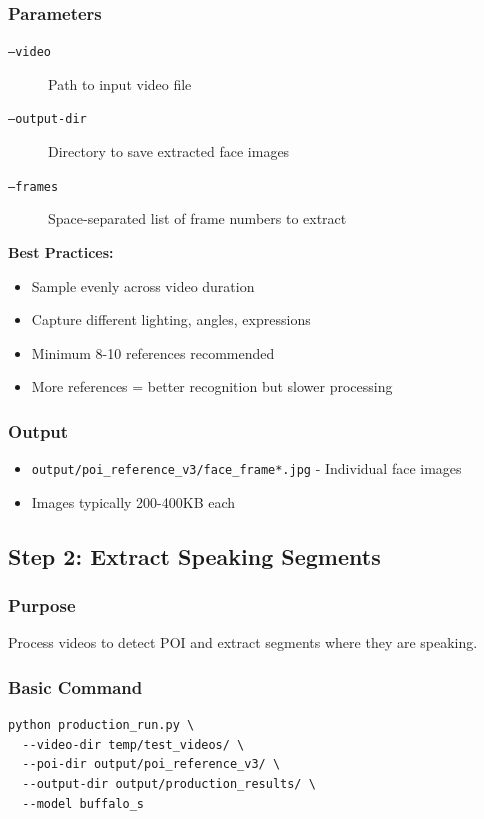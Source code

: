 \documentclass[11pt,a4paper]{article}
\begin{document}
\subsubsection{Parameters}

\begin{description}
    \item[\texttt{--video}] Path to input video file
    \item[\texttt{--output-dir}] Directory to save extracted face images
    \item[\texttt{--frames}] Space-separated list of frame numbers to extract
\end{description}

\textbf{Best Practices:}
\begin{itemize}
    \item Sample evenly across video duration
    \item Capture different lighting, angles, expressions
    \item Minimum 8-10 references recommended
    \item More references = better recognition but slower processing
\end{itemize}

\subsubsection{Output}
\begin{itemize}
    \item \texttt{output/poi\_reference\_v3/face\_frame*.jpg} - Individual face images
    \item Images typically 200-400KB each
\end{itemize}

\subsection{Step 2: Extract Speaking Segments}

\subsubsection{Purpose}
Process videos to detect POI and extract segments where they are speaking.

\subsubsection{Basic Command}
\begin{lstlisting}[style=bashcode]
python production_run.py \
  --video-dir temp/test_videos/ \
  --poi-dir output/poi_reference_v3/ \
  --output-dir output/production_results/ \
  --model buffalo_s
\end{lstlisting}
\end{document}
